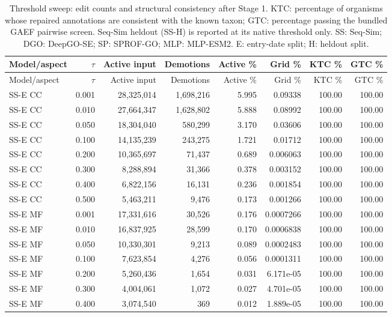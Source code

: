 \begingroup\scriptsize
\setlength{\tabcolsep}{4pt}
\begin{longtable}{lrrrrrrr}
\caption{Threshold sweep: edit counts and structural consistency after Stage 1. KTC: percentage of organisms whose repaired annotations are consistent with the known taxon; GTC: percentage passing the bundled GAEF pairwise screen. Seq-Sim heldout (SS-H) is reported at its native threshold only. SS: Seq-Sim; DGO: DeepGO-SE; SP: SPROF-GO; MLP: MLP-ESM2. E: entry-date split; H: heldout split.}\label{tab:supp-threshold-flips}\\
\toprule
Model/aspect & $\tau$ & Active input & Demotions & Active \% & Grid \% & KTC \% & GTC \% \\
\midrule
\endfirsthead
\toprule
Model/aspect & $\tau$ & Active input & Demotions & Active \% & Grid \% & KTC \% & GTC \% \\
\midrule
\endhead
SS-E CC & 0.001 & 28,325,014 & 1,698,216 & 5.995 & 0.09338 & 100.00 & 100.00 \\
SS-E CC & 0.010 & 27,664,347 & 1,628,802 & 5.888 & 0.08992 & 100.00 & 100.00 \\
SS-E CC & 0.050 & 18,304,040 & 580,299 & 3.170 & 0.03606 & 100.00 & 100.00 \\
SS-E CC & 0.100 & 14,135,239 & 243,275 & 1.721 & 0.01712 & 100.00 & 100.00 \\
SS-E CC & 0.200 & 10,365,697 & 71,437 & 0.689 & 0.006063 & 100.00 & 100.00 \\
SS-E CC & 0.300 & 8,288,894 & 31,366 & 0.378 & 0.003152 & 100.00 & 100.00 \\
SS-E CC & 0.400 & 6,822,156 & 16,131 & 0.236 & 0.001854 & 100.00 & 100.00 \\
SS-E CC & 0.500 & 5,463,211 & 9,476 & 0.173 & 0.001266 & 100.00 & 100.00 \\
SS-E MF & 0.001 & 17,331,616 & 30,526 & 0.176 & 0.0007266 & 100.00 & 100.00 \\
SS-E MF & 0.010 & 16,837,925 & 28,599 & 0.170 & 0.0006838 & 100.00 & 100.00 \\
SS-E MF & 0.050 & 10,330,301 & 9,213 & 0.089 & 0.0002483 & 100.00 & 100.00 \\
SS-E MF & 0.100 & 7,623,854 & 4,276 & 0.056 & 0.0001311 & 100.00 & 100.00 \\
SS-E MF & 0.200 & 5,260,436 & 1,654 & 0.031 & 6.171e-05 & 100.00 & 100.00 \\
SS-E MF & 0.300 & 4,004,061 & 1,072 & 0.027 & 4.701e-05 & 100.00 & 100.00 \\
SS-E MF & 0.400 & 3,074,540 & 369 & 0.012 & 1.889e-05 & 100.00 & 100.00 \\

\end{longtable}
